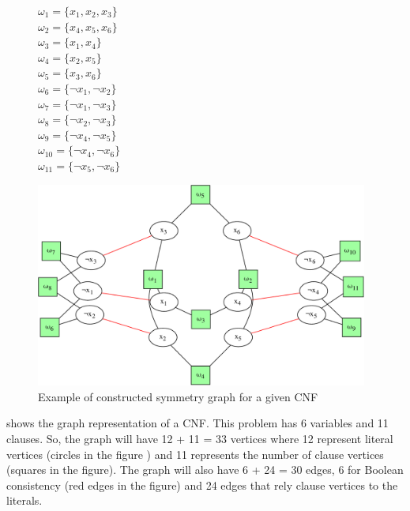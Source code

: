 \begin{figure}[h!]
 \begin{minipage}[c]{.2\textwidth}
  $\omega_{1} = \{ x_{1}, x_{2}, x_{3} \}$ \\
  $\omega_{2} = \{ x_{4}, x_{5}, x_{6} \}$ \\
  $\omega_{3} = \{ x_{1}, x_{4} \}$ \\
  $\omega_{4} = \{ x_{2}, x_{5} \}$ \\
  $\omega_{5} = \{ x_{3}, x_{6} \}$ \\
  $\omega_{6} = \{ \neg x_{1}, \neg x_{2} \}$ \\
  $\omega_{7} = \{ \neg x_{1}, \neg x_{3} \}$ \\
  $\omega_{8} = \{ \neg x_{2}, \neg x_{3} \}$ \\
  $\omega_{9} = \{ \neg x_{4}, \neg x_{5} \}$ \\
  $\omega_{10} = \{ \neg x_{4}, \neg x_{6} \}$ \\
  $\omega_{11} = \{ \neg x_{5}, \neg x_{6} \}$ \\
  
 \end{minipage}
 \begin{minipage}[l]{.75\textwidth}
  \includegraphics[width=4.3in]{cnfs/graph_cnf_no_opt-crop}
 \end{minipage}
 \caption{Example of constructed symmetry graph for a given CNF}
 \label{fig:graph_no_opt}
\end{figure}

 shows the graph representation of a CNF. This problem has 6 variables and 11
clauses. So, the graph will have  12  + 11 = 33 vertices where 12 represent literal vertices (circles in the figure ) 
and 11 represents the number of clause vertices (squares in the figure). The graph will also have 6 + 24 = 30 edges, 6 for Boolean consistency 
(red edges in the figure) and 24 edges that rely clause vertices to the literals.

